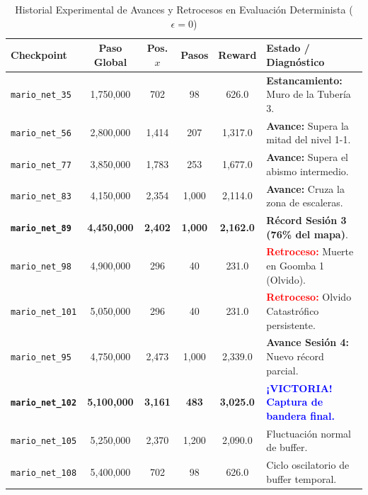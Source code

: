 \documentclass[11pt,letterpaper]{article}
\begin{document}
\begin{table}[H]
\centering
\small
\caption{Historial Experimental de Avances y Retrocesos en Evaluación Determinista ($\epsilon=0$)}
\label{tab:checkpoints_evolucion}
\begin{tabularx}{\textwidth}{p{2.3cm}ccccX}
\toprule
\textbf{Checkpoint} & \textbf{Paso Global} & \textbf{Pos. $x$} & \textbf{Pasos} & \textbf{Reward} & \textbf{Estado / Diagnóstico} \\
\midrule
\texttt{mario\_net\_35} & 1,750,000 & 702 & 98 & 626.0 & \textbf{Estancamiento:} Muro de la Tubería 3. \\
\texttt{mario\_net\_56} & 2,800,000 & 1,414 & 207 & 1,317.0 & \textbf{Avance:} Supera la mitad del nivel 1-1. \\
\texttt{mario\_net\_77} & 3,850,000 & 1,783 & 253 & 1,677.0 & \textbf{Avance:} Supera el abismo intermedio. \\
\texttt{mario\_net\_83} & 4,150,000 & 2,354 & 1,000 & 2,114.0 & \textbf{Avance:} Cruza la zona de escaleras. \\
\textbf{\texttt{mario\_net\_89}} & \textbf{4,450,000} & \textbf{2,402} & \textbf{1,000} & \textbf{2,162.0} & \textbf{Récord Sesión 3 (76\% del mapa)}. \\
\texttt{mario\_net\_98} & 4,900,000 & 296 & 40 & 231.0 & \textcolor{red}{\textbf{Retroceso:}} Muerte en Goomba 1 (Olvido). \\
\texttt{mario\_net\_101} & 5,050,000 & 296 & 40 & 231.0 & \textcolor{red}{\textbf{Retroceso:}} Olvido Catastrófico persistente. \\
\midrule
\texttt{mario\_net\_95} & 4,750,000 & 2,473 & 1,000 & 2,339.0 & \textbf{Avance Sesión 4:} Nuevo récord parcial. \\
\textbf{\texttt{mario\_net\_102}} & \textbf{5,100,000} & \textbf{3,161} & \textbf{483} & \textbf{3,025.0} & \textcolor{blue}{\textbf{¡VICTORIA! Captura de bandera final.}} \\
\texttt{mario\_net\_105} & 5,250,000 & 2,370 & 1,200 & 2,090.0 & Fluctuación normal de buffer. \\
\texttt{mario\_net\_108} & 5,400,000 & 702 & 98 & 626.0 & Ciclo oscilatorio de buffer temporal. \\
\bottomrule
\end{tabularx}
\end{table}
\end{document}

